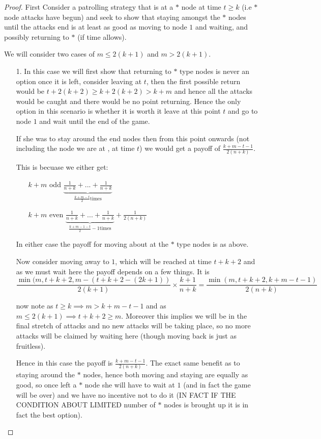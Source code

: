 \documentclass[a4paper,10pt]{article}
\theoremstyle{definition}
\theoremstyle{definition}
\theoremstyle{remark}
\theoremstyle{definition}
\begin{document}
\begin{proof}
First Consider a patrolling strategy that is at a $*$ node at time $t \geq k$ (i.e $*$ node attacks have begun) and seek to show that staying amongst the $*$ nodes until the attacks end is at least as good as moving to node $1$ and waiting, and possibly returning to $*$ (if time allows).

We will consider two cases of $m \leq 2(k+1)$ and $m > 2(k+1)$.
\begin{itemize}
\item[1.] In this case we will first show that returning to $*$ type nodes is never an option once it is left, consider leaving at $t$, then the first possible return would be $t+2(k+2) \geq k + 2(k+2) > k+m$ and hence all the attacks would be caught and there would be no point returning. Hence the only option in this scenario is whether it is worth it leave at this point $t$ and go to node $1$ and wait until the end of the game.

If she was to stay around the end nodes then from this point onwards (not including the node we are at , at time $t$) we would get a payoff of $\frac{k+m-t-1}{2(n+k)}$.

This is becuase we either get:
\begin{itemize}
\item[$k+m$ odd] $\underbrace{\frac{1}{n+k}+...+\frac{1}{n+k}}_{\frac{k+m-t}{2} \text{times}}$
\item[$k+m$ even] $\underbrace{\frac{1}{n+k}+...+\frac{1}{n+k}}_{\frac{k+m-1-t}{2}-1 \text{times}} +\frac{1}{2(n+k)}$
\end{itemize}

In either case the payoff for moving about at the $*$ type nodes is as above.

Now consider moving away to $1$, which will be reached at time $t+k+2$ and as we must wait here the payoff depends on a few things. It is 
$$\frac{\min (m,t+k+2,m-(t+k+2-(2k+1))}{2(k+1)} \times \frac{k+1}{n+k} =
\frac{\min (m,t+k+2,k+m-t-1)}{2(n+k)}$$

now note as $t \geq k \implies m > k+m-t-1$ and as $m \leq 2(k+1) \implies t+k+2 \geq m$. Moreover this implies we will be in the final stretch of attacks and no new attacks will be taking place, so no more attacks will be claimed by waiting here (though moving back is just as fruitless).

Hence in this case the payoff is $\frac{k+m-t-1}{2(n+k)}$. The exact same benefit as to staying around the $*$ nodes, hence both moving and staying are equally as good, so once left a $*$ node she will have to wait at $1$ (and in fact the game will be over) and we have no incentive not to do it (IN FACT IF THE CONDITION ABOUT LIMITED number of $*$ nodes is brought up it is in fact the best option).


\end{itemize}
\end{proof}
\end{document}
